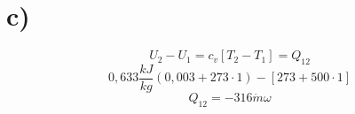

\section*{c)}
\[
U_2 - U_1 = c_v \left[ T_2 - T_1 \right] = Q_{12}
\]
\[
0,633 \frac{kJ}{kg} \left(0,003 + 273 \cdot 1\right) - \left[273 + 500 \cdot 1\right]
\]
\[
Q_{12} = -316 \dot{m} \omega
\]